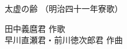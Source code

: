 \documentclass[10pt,b5j]{tarticle} %
\begin{document}
\begin{minipage}[c]{0.6\hsize} %
    \begin{center}
        {\LARGE
            太虚の齢 %
        }
        {\small 
            （明治四十一年寮歌） %
        }
    \end{center}
\end{minipage}
\begin{minipage}[c]{0.4\hsize} %
    \begin{flushright} %
        田中義麿君 作歌\\早川直瀬君・前川徳次郎君 作曲 %
    \end{flushright}
\end{minipage}
\end{document}
